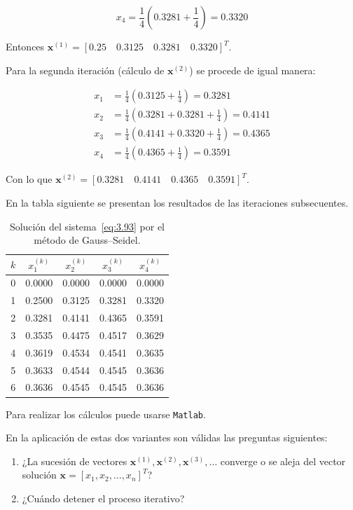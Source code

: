 \documentclass[12pt,letterpaper]{article}
\theoremstyle{definition}
\theoremstyle{plain}
\theoremstyle{remark}
\begin{document}
\[
x_4 = \frac{1}{4} (0.3281 + \frac{1}{4}) = 0.3320
\]

Entonces $\mathbf{x}^{(1)} = [0.25 \quad 0.3125 \quad 0.3281 \quad 0.3320]^T$.

Para la segunda iteración (cálculo de $\mathbf{x}^{(2)}$) se procede de igual manera:

\[
\begin{aligned}
x_1 &= \frac{1}{4} (0.3125 + \frac{1}{4}) = 0.3281 \\
x_2 &= \frac{1}{4} (0.3281 + 0.3281 + \frac{1}{4}) = 0.4141 \\
x_3 &= \frac{1}{4} (0.4141 + 0.3320 + \frac{1}{4}) = 0.4365 \\
x_4 &= \frac{1}{4} (0.4365 + \frac{1}{4}) = 0.3591
\end{aligned}
\]

Con lo que $\mathbf{x}^{(2)} = [0.3281 \quad 0.4141 \quad 0.4365 \quad 0.3591]^T$.

En la tabla siguiente se presentan los resultados de las iteraciones subsecuentes.

\begin{table}[h!]
\centering
\caption{Solución del sistema~\eqref{eq:3.93} por el método de Gauss–Seidel.}
\begin{tabular}{c|c c c c}
$k$ & $x_1^{(k)}$ & $x_2^{(k)}$ & $x_3^{(k)}$ & $x_4^{(k)}$ \\
\hline
0 & 0.0000 & 0.0000 & 0.0000 & 0.0000 \\
1 & 0.2500 & 0.3125 & 0.3281 & 0.3320 \\
2 & 0.3281 & 0.4141 & 0.4365 & 0.3591 \\
3 & 0.3535 & 0.4475 & 0.4517 & 0.3629 \\
4 & 0.3619 & 0.4534 & 0.4541 & 0.3635 \\
5 & 0.3633 & 0.4544 & 0.4545 & 0.3636 \\
6 & 0.3636 & 0.4545 & 0.4545 & 0.3636
\end{tabular}
\end{table}

\noindent
Para realizar los cálculos puede usarse \texttt{Matlab}.



En la aplicación de estas dos variantes son válidas las preguntas siguientes:

\begin{enumerate}
    \item ¿La sucesión de vectores $\mathbf{x}^{(1)}, \mathbf{x}^{(2)}, \mathbf{x}^{(3)}, \ldots$ converge o se aleja del vector solución $\mathbf{x} = [x_1, x_2, \ldots, x_n]^T$?
    \item ¿Cuándo detener el proceso iterativo?
\end{enumerate}
\end{document}
